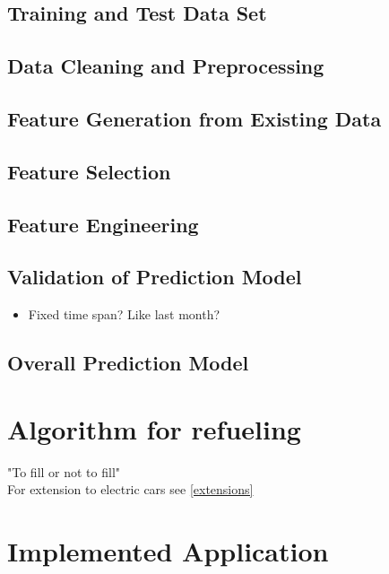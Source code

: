 \documentclass[%
a4paper,
DIV12,
2.5headlines,
bigheadings,
titlepage,
openbib,
]{scrartcl}
\begin{document}
\subsection{Training and Test Data
Set}\label{training-and-test-data-set}


\subsection{Data Cleaning and
Preprocessing}\label{data-cleaning-and-preprocessing}


\subsection{Feature Generation from Existing
Data}\label{feature-generation-from-existing-data}


\subsection{Feature Selection}\label{feature-selection}



\subsection{Feature Engineering}\label{feature-engineering}



\subsection{Validation of Prediction
Model}\label{validation-of-prediction-model}
\begin{itemize}
\item Fixed time span? Like last month?
\end{itemize}


\subsection{Overall Prediction Model}\label{overall-prediction-model}

\section{Algorithm for refueling}
"To fill or not to fill"\cite{khuller2007fill}\\
For extension to electric cars see \ref{extensions}

\section{Implemented Application}\label{implemented-application}
\end{document}
